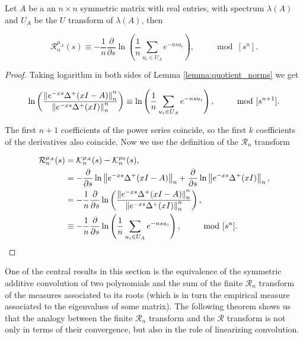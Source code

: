 \begin{corollary} \label{corollary:R_n_as_a_logarithm}
    Let $A$ be a an $n\times n$ symmetric matrix with real entries, with spectrum $\lambda(A)$ and $U_A$ be the $U$ transform of $\lambda(A)$, then 

    \begin{equation*}
        \mathcal R_{n}^{\mu_A}(s) \equiv - \frac1n \frac{\partial}{\partial s} \ln \left(\frac1n \sum_{u_i \in U_A} e^{-nsu_i} \right), \qquad \mod [s^n].
    \end{equation*}
\end{corollary}

\begin{proof}
    Taking logarithm in both sides of Lemma \ref{lemma:quotient_norms} we get 

    \begin{equation*}
        \ln \left( \frac{\left\lVert e^{-xs}\Delta^+(xI - A)\right\rVert_n^n}{\left\lVert e^{-xs}\Delta^+(xI)\right\rVert_n^n} \right) \equiv \ln\left( \frac1n\sum_{u_i \in U_A} e^{-ns u_i} \right), \qquad \mod [s^{n+1}].
    \end{equation*}

    The first $n+1$ coefficients of the power series coincide, so the first $k$ coefficients of the derivatives also coincide. Now we use the definition of the $\mathcal R_n$ transform

    \begin{align*}
        \mathcal R_{n}^{\mu_A}(s) &= \mathcal K_{n}^{\mu_A}(s) - \mathcal K_n^{\mu_0}(s), \\
        &= - \frac{\partial}{\partial s} \ln \left\lVert e^{-xs}\Delta^+(xI -A) \right\rVert_n + \frac{\partial}{\partial s} \ln \left\lVert e^{-xs}\Delta^+(xI) \right\rVert_n,\\
        &= - \frac1n \frac{\partial}{\partial s} \ln \left( \frac{\left\lVert e^{-xs}\Delta^+(xI -A)\right\rVert_n^n}{ \left\lVert e^{-xs}\Delta^+(xI)\right\rVert_n^n } \right), \\
        &\equiv -\frac1n \frac{\partial}{\partial s} \ln \left( \frac1n \sum_{u_i \in U_A} e^{-nsu_i} \right), \qquad \mod[s^n].
    \end{align*}
\end{proof}

One of the central results in this section is the equivalence of the symmetric additive convolution of two polynomials and the sum of the finite $\mathcal R_n$ transform of the measures associated to its roots (which is in turn the empirical measure associated to the eigenvalues of some matrix). The following theorem shows us that the analogy between the finite $\mathcal R_n$ transform and the $\mathcal R$ transform is not only in terms of their convergence, but also in the role of linearizing convolution. 

